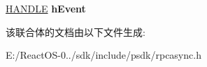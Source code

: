 \begin{DoxyCompactItemize}
\begin{tabbing}
\end{tabbing}\item 
\mbox{\label{union___r_p_c___a_s_y_n_c___n_o_t_i_f_i_c_a_t_i_o_n___i_n_f_o_ac108f225ec77056e4133d84cf2e9fec9}} 
\hyperlink{interfacevoid}{H\+A\+N\+D\+LE} {\bfseries h\+Event}
\end{DoxyCompactItemize}


该联合体的文档由以下文件生成\+:\begin{DoxyCompactItemize}
\item 
E\+:/\+React\+O\+S-\/0../sdk/include/psdk/rpcasync.\+h\end{DoxyCompactItemize}
